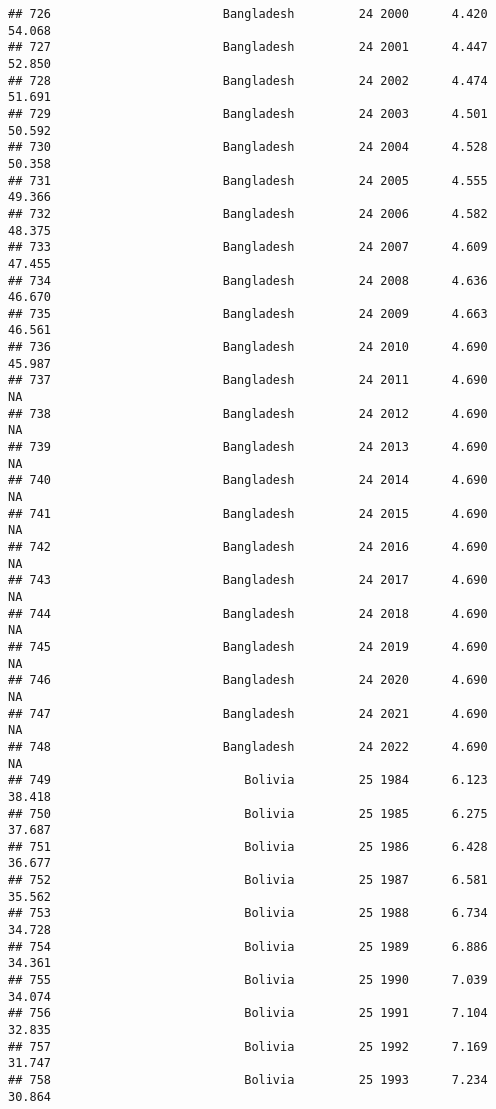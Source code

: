 \documentclass[
]{article}
\begin{document}
\begin{verbatim}
## 726                        Bangladesh         24 2000      4.420     54.068
## 727                        Bangladesh         24 2001      4.447     52.850
## 728                        Bangladesh         24 2002      4.474     51.691
## 729                        Bangladesh         24 2003      4.501     50.592
## 730                        Bangladesh         24 2004      4.528     50.358
## 731                        Bangladesh         24 2005      4.555     49.366
## 732                        Bangladesh         24 2006      4.582     48.375
## 733                        Bangladesh         24 2007      4.609     47.455
## 734                        Bangladesh         24 2008      4.636     46.670
## 735                        Bangladesh         24 2009      4.663     46.561
## 736                        Bangladesh         24 2010      4.690     45.987
## 737                        Bangladesh         24 2011      4.690         NA
## 738                        Bangladesh         24 2012      4.690         NA
## 739                        Bangladesh         24 2013      4.690         NA
## 740                        Bangladesh         24 2014      4.690         NA
## 741                        Bangladesh         24 2015      4.690         NA
## 742                        Bangladesh         24 2016      4.690         NA
## 743                        Bangladesh         24 2017      4.690         NA
## 744                        Bangladesh         24 2018      4.690         NA
## 745                        Bangladesh         24 2019      4.690         NA
## 746                        Bangladesh         24 2020      4.690         NA
## 747                        Bangladesh         24 2021      4.690         NA
## 748                        Bangladesh         24 2022      4.690         NA
## 749                           Bolivia         25 1984      6.123     38.418
## 750                           Bolivia         25 1985      6.275     37.687
## 751                           Bolivia         25 1986      6.428     36.677
## 752                           Bolivia         25 1987      6.581     35.562
## 753                           Bolivia         25 1988      6.734     34.728
## 754                           Bolivia         25 1989      6.886     34.361
## 755                           Bolivia         25 1990      7.039     34.074
## 756                           Bolivia         25 1991      7.104     32.835
## 757                           Bolivia         25 1992      7.169     31.747
## 758                           Bolivia         25 1993      7.234     30.864

\end{verbatim}
\end{document}
